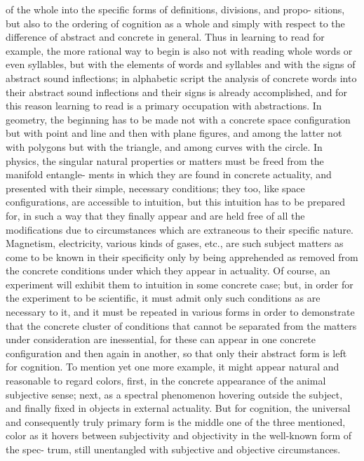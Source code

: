 of the whole into the specific forms of definitions, divisions, and propo-
sitions, but also to the ordering of cognition as a whole and simply with
respect to the difference of abstract and concrete in general.
Thus in learning to read for example, the more rational way to begin is also not
with reading whole words or even syllables,
but with the elements of words
and syllables
 and with the signs of abstract sound inflections;
  in alphabetic
script the analysis of concrete words into their abstract sound inflections
and their signs is already accomplished,
and for this reason learning to read
is a primary occupation with abstractions.
In geometry, the beginning has
to be made not with a concrete space configuration but with point and line
and then with plane figures, and among the latter not with polygons but
with the triangle, and among curves with the circle.
 In physics, the singular
natural properties or matters must be freed from the manifold entangle-
ments in which they are found in concrete actuality, and presented with
their simple, necessary conditions; they too, like space configurations, are
accessible to intuition, but this intuition has to be prepared for, in such a
way that they finally appear and are held free of all the modifications due
to circumstances which are extraneous to their specific nature. Magnetism,
electricity, various kinds of gases, etc., are such subject matters as come
to be known in their specificity only by being apprehended as removed
from the concrete conditions under which they appear in actuality. Of
course, an experiment will exhibit them to intuition in some concrete case;
but, in order for the experiment to be scientific, it must admit only such
conditions as are necessary to it, and it must be repeated in various forms
in order to demonstrate that the concrete cluster of conditions that cannot
be separated from the matters under consideration are inessential, for these
can appear in one concrete configuration and then again in another, so that
only their abstract form is left for cognition.
To mention yet one more
example,
it might appear natural and reasonable to regard colors,
first, in
the concrete appearance of the animal subjective sense;
 next, as a spectral
phenomenon hovering outside the subject, and finally fixed in objects in
external actuality.
 But for cognition, the universal and consequently truly
primary form is the middle one of the three mentioned,
color as it hovers
between subjectivity and objectivity in the well-known form of the spec-
trum,
still unentangled with subjective and objective circumstances.
